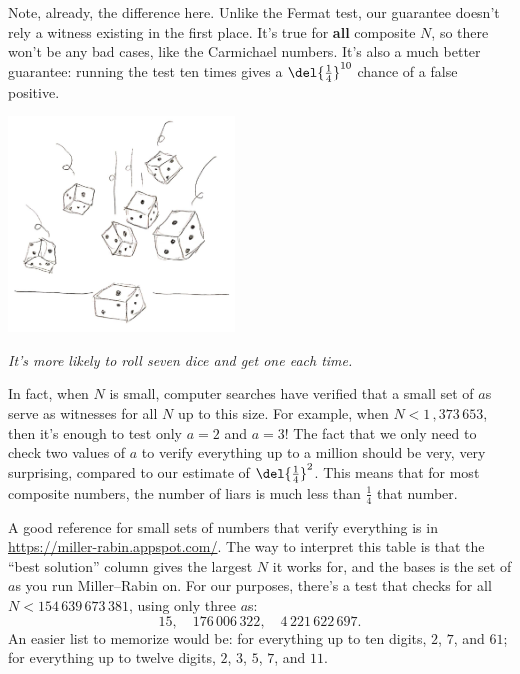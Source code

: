 \documentclass[11pt,paper=letter]{scrartcl}
\begin{document}
Note, already, the difference here. Unlike the Fermat test, our guarantee doesn't rely a witness existing in the first place. It's true for \textbf{all} composite $N$, so there won't be any bad cases, like the Carmichael numbers. It's also a much better guarantee: running the test ten times gives a $\del{\frac14}^{10}$ chance of a false positive.

\begin{center}
  \includegraphics[height=2.25in]{4.jpg}

  \emph{\footnotesize It's more likely to roll seven dice and get one each time.}
\end{center}

In fact, when $N$ is small, computer searches have verified that a small set of $a$s serve as witnesses for all $N$ up to this size. For example, when $N < 1\,,373\,653$, then it's enough to test only $a = 2$ and $a = 3$! The fact that we only need to check two values of $a$ to verify everything up to a million should be very, very surprising, compared to our estimate of $\del{\frac14}^2$. This means that for most composite numbers, the number of liars is much less than $\frac14$ that number.

A good reference for small sets of numbers that verify everything is in \url{https://miller-rabin.appspot.com/}. The way to interpret this table is that the ``best solution'' column gives the largest $N$ it works for, and the bases is the set of $a$s you run Miller--Rabin on. For our purposes, there's a test that checks for all $N < 154\,639\,673\,381$, using only three $a$s:
$$15,\quad 176\,006\,322,\quad 4\,221\,622\,697.$$
An easier list to memorize would be: for everything up to ten digits, $2$, $7$, and $61$; for everything up to twelve digits, $2$, $3$, $5$, $7$, and $11$.
\end{document}
